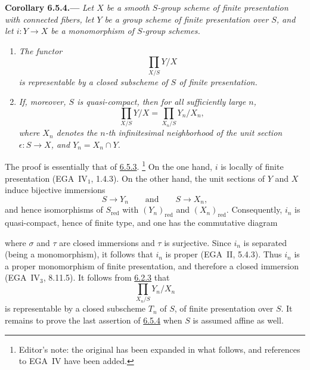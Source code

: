 
\medskip
{}\label{cor:sga3-VIB-6.5.4}%
\noindent\textbf{Corollary 6.5.4.---}
\emph{Let \(X\) be a smooth \(S\)-group scheme of finite
presentation with connected fibers, let \(Y\) be a group scheme
of finite presentation over \(S\), and let \(i:Y\to X\) be a
monomorphism of \(S\)-group schemes.}
\begin{enumerate}
\item[\textup{(i)}]\label{concl:sga3-VIB-6.5.4-i}
  \emph{The functor
  \[
    \prod_{X/S}Y/X
  \]
  is representable by a closed subscheme of \(S\) of finite
  presentation.}
\item[\textup{(ii)}]\label{concl:sga3-VIB-6.5.4-ii}
  \emph{If, moreover, \(S\) is quasi-compact, then for all
  sufficiently large \(n\),
  \[
    \prod_{X/S}Y/X
      =\prod_{X_n/S}Y_n/X_n,
  \]
  where \(X_n\) denotes the \(n\)-th infinitesimal neighborhood
  of the unit section \(\epsilon:S\to X\), and
  \(Y_n=X_n\cap Y\).}
\end{enumerate}

The proof is essentially that of
\hyperref[cor:sga3-VIB-6.5.3]{6.5.3}.%
\footnote{\label{note:sga3-VIB-65}Editor's note: the original has
been expanded in what follows, and references to EGA~IV have
been added.}
On the one hand, \(i\) is locally of finite presentation
(EGA~IV\(_1\), 1.4.3). On the other hand, the unit sections of
\(Y\) and \(X\) induce bijective immersions
\[
  S\longrightarrow Y_n
  \qquad\text{and}\qquad
  S\longrightarrow X_n,
\]
and hence isomorphisms of \(S_{\mathrm{red}}\) with
\((Y_n)_{\mathrm{red}}\) and \((X_n)_{\mathrm{red}}\).
Consequently, \(i_n\) is quasi-compact, hence of finite type, and
one has the commutative diagram
\begin{figure}[H]
  \centering
  \label{fig:sga3-VIB-6.5.4-reduced-triangle}%
\end{figure}
where \(\sigma\) and \(\tau\) are closed immersions and \(\tau\)
is surjective. Since \(i_n\) is separated (being a
monomorphism), it follows that \(i_n\) is proper
(EGA~II, 5.4.3). Thus \(i_n\) is a proper monomorphism of finite
presentation, and therefore a closed immersion
(EGA~IV\(_3\), 8.11.5). It follows from
\hyperref[thm:sga3-VIB-6.2.3]{6.2.3} that
\[
  \prod_{X_n/S}Y_n/X_n
\]
is representable by a closed subscheme \(T_n\) of \(S\), of
finite presentation over \(S\). It remains to prove the last
assertion of \hyperref[cor:sga3-VIB-6.5.4]{6.5.4} when \(S\) is assumed affine as well.

